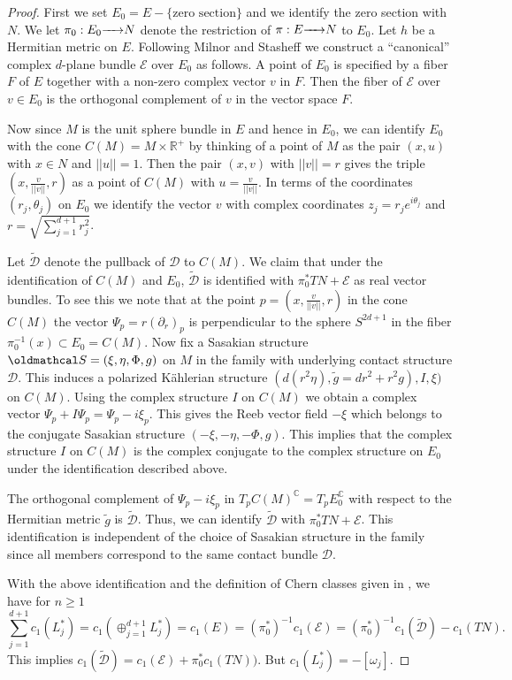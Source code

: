 \documentclass[12pt]{amsart}
\def\bbc{{\mathbb C}}
\def\bbr{{\mathbb R}}
\def\gro{\omega}
\def\cald{{\mathcal D}}
\def\cale{{\mathcal E}}
\def\cals{{\oldmathcal S}}
\def\ra#1{\hbox to #1pc{\rightarrowfill}}
\begin{document}
\begin{proof}
First we set $E_0=E-\{\text{zero section}\}$ and we identify the zero section with $N$. We let $\pi_0:E_0\ra{1.5} N$ denote the restriction of $\pi:E\ra{1.5} N$ to $E_0$.  Let $h$ be a Hermitian metric on $E$. Following Milnor and Stasheff \cite{MiSt74} we construct a ``canonical'' complex $d$-plane bundle $\cale$ over $E_0$ as follows. A point of $E_0$ is specified by a fiber $F$ of $E$ together with a non-zero complex vector $v$ in $F$. Then the fiber of $\cale$ over $v\in E_0$ is the orthogonal complement of $v$ in the vector space $F$.

Now since $M$ is the unit sphere bundle in $E$ and hence in $E_0$, we can identify $E_0$ with the cone $C(M)=M\times\bbr^+$ by thinking of a point of $M$ as the pair $(x,u)$ with $x\in N$ and $||u||=1$. Then the pair $(x,v)$ with $||v||=r$ gives the triple $(x,\frac{v}{||v||},r)$ as a point of $C(M)$ with $u=\frac{v}{||v||}$. In terms of the coordinates $(r_j,\theta_j)$ on $E_0$ we identify the vector $v$ with complex coordinates $z_j=r_je^{i\theta_j}$ and $r=\sqrt{\sum_{j=1}^{d+1}r_j^2}$.

Let $\tilde{\cald}$ denote the pullback of $\cald$ to $C(M)$. We claim that under the identification of $C(M)$ and $E_0$, $\tilde{\cald}$ is identified with $\pi_0^*TN+\cale$ as real vector bundles. To see this we note that at the point $p=(x,\frac{v}{||v||},r)$ in the cone $C(M)$ the vector $\Psi_p=r(\partial_r)_p$ is perpendicular to the sphere $S^{2d+1}$ in the fiber $\pi_0^{-1}(x)\subset E_0=C(M)$. Now fix a Sasakian structure $\cals=(\xi,\eta,\Phi,g)$ on $M$ in the family with underlying contact structure $\cald$. This induces a polarized K\"ahlerian structure $(d(r^2\eta),\tilde{g}=dr^2+r^2g),I,\xi)$ on $C(M)$. Using the complex structure $I$ on $C(M)$ we obtain a complex vector $\Psi_p+I\Psi_p=\Psi_p-i\xi_p$. This gives the Reeb vector field $-\xi$ which belongs to the conjugate Sasakian structure $(-\xi,-\eta,-\Phi,g)$. This implies that the complex structure $I$ on $C(M)$ is the complex conjugate to the complex structure on $E_0$ under the identification described above. 

The orthogonal complement of $\Psi_p-i\xi_p$ in $T_pC(M)^\bbc=T_pE_0^\bbc$ with respect to the Hermitian metric $\tilde{g}$ is $\tilde{\cald}$. Thus, we can identify $\tilde{\cald}$ with $\pi_0^*TN+\cale$. This identification is independent of the choice of Sasakian structure in the family since all members correspond to the same contact  bundle $\cald$. 

With the above identification and the definition of Chern classes given in \cite{MiSt74}, we have for $n\geq 1$
$$\sum_{j=1}^{d+1}c_1(L^*_j)=c_1(\oplus_{j=1}^{d+1}L^*_j)=c_1(E)=(\pi_0^*)^{-1}c_1(\cale)=(\pi_0^*)^{-1}c_1(\tilde{\cald})-c_1(TN).$$
This implies $c_1(\tilde{\cald})=c_1(\cale)+\pi_0^*c_1(TN))$. But $c_1(L^*_j)=-[\gro_j]$.
\end{proof}
\end{document}
